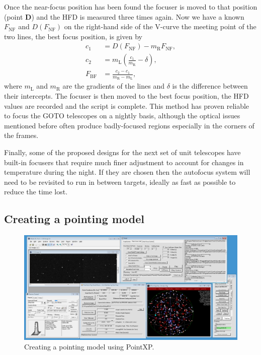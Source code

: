 \begin{colsection}
\begin{colsection}
Once the near-focus position has been found the focuser is moved to that position (point \textbf{D}) and the HFD is measured three times again. Now we have a known $F_\text{NF}$ and $D(F_\text{NF})$ on the right-hand side of the V-curve the meeting point of the two lines, the best focus position, is given by
%
\begin{equation}
    \begin{split}
                c_1 & = D(F_\text{NF}) - m_\text{R} F_\text{NF}, \\
                c_2 & = m_\text{L}(\frac{c_1}{m_\text{R}} - \delta), \\
        F_\text{BF} & = \frac{c_2 - c_1}{m_\text{R} - m_\text{L}},
    \end{split}
    \label{eq:bestfocus}
\end{equation}
%
where $m_\text{L}$ and $m_\text{R}$ are the gradients of the lines and $\delta$ is the difference between their intercepts. The focuser is then moved to the best focus position, the HFD values are recorded and the script is complete. This method has proven reliable to focus the GOTO telescopes on a nightly basis, although the optical issues mentioned before often produce badly-focused regions especially in the corners of the frames.

Finally, some of the proposed designs for the next set of unit telescopes have built-in focusers that require much finer adjustment to account for changes in temperature during the night. If they are chosen then the autofocus system will need to be revisited to run in between targets, ideally as fast as possible to reduce the time lost.

\end{colsection}

\newpage
\subsection{Creating a pointing model}
\label{sec:pointxp}
\begin{colsection}

\begin{figure}[t]
    \begin{center}
        \includegraphics[width=\textwidth]{images/pointing_model.png}
    \end{center}
    \caption[Creating a pointing model using PointXP]{
        Creating a pointing model using PointXP.\@
    }\label{fig:pointing_model}
\end{figure}


\end{colsection}
\end{colsection}
